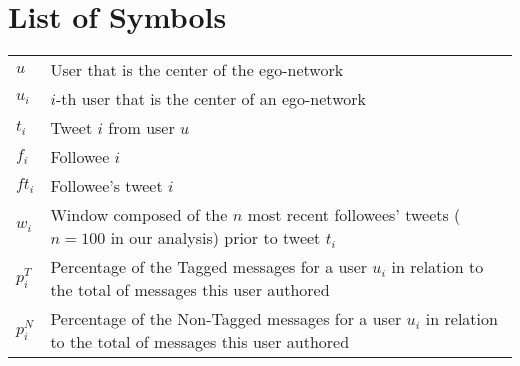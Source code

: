 \documentclass[11pt,twoside,a4paper]{book}
\renewcommand{\chaptermark}[1]{\markboth{\MakeUppercase{#1}}{}}
\begin{document}
\chapter{List of Symbols}
\begin{table}[htbp]
	\begin{tabular}{>{\raggedright\arraybackslash}m{2cm}m{14cm}}
					$u$    & User that is the center of the ego-network\\
					$u_i$    & $i$-th user that is the center of an ego-network\\
					$t_i$    & Tweet $i$ from user $u$\\
					$f_i$    & Followee $i$\\
					$ft_i$    & Followee's tweet $i$\\
					$w_i$    & Window composed of the $n$ most recent followees' tweets ($n=100$ in our analysis) prior to tweet $t_i$\\
					$p_i^T$    & Percentage of the Tagged messages for a user $u_i$ in relation to the total of messages this user authored\\
					$p_i^N$    & Percentage of the Non-Tagged messages for a user $u_i$ in relation to the total of messages this user authored\\
	\end{tabular}
\end{table}

\listoffigures            
\listoftables            

\mainmatter

\fancyhead[RE,LO]{\thesection}

\singlespacing              %
\hypersetup{pageanchor=true}








\renewcommand{\chaptermark}[1]{\markboth{\MakeUppercase{\appendixname\ \thechapter}} {\MakeUppercase{#1}} }
\fancyhead[RE,LO]{}
\appendix

% 

\backmatter \singlespacing   %


%
\end{document}
